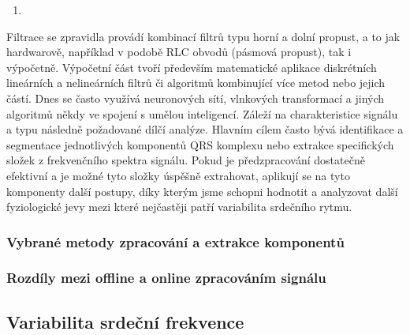 \begin{enumerate}
	\item 
\end{enumerate}


Filtrace se zpravidla provádí kombinací filtrů typu horní a dolní propust, a to
jak hardwarově, například v podobě RLC obvodů (pásmová propust), tak i
výpočetně. Výpočetní část tvoří především matematické aplikace diskrétních
lineárních a nelineárních filtrů či algoritmů kombinující více metod nebo jejich
částí. Dnes se často využívá neuronových sítí, vlnkových transformací a jiných
algoritmů někdy ve spojení s umělou inteligencí. Záleží na charakteristice
signálu a typu následně požadované dílčí analýze. Hlavním cílem často bývá
identifikace a segmentace jednotlivých komponentů QRS komplexu nebo extrakce
specifických složek z frekvenčního spektra signálu. Pokud je předzpracování
dostatečně efektivní a je možné tyto složky úspěšně extrahovat, aplikují se na
tyto komponenty další postupy, díky kterým jsme schopni hodnotit a analyzovat
další fyziologické jevy mezi které nejčastěji patří variabilita srdečního rytmu.

\subsubsection{Vybrané metody zpracování a extrakce komponentů}
\subsubsection{Rozdíly mezi offline a online zpracováním signálu}

\subsection{Variabilita srdeční frekvence}
\label{section:hrv}

